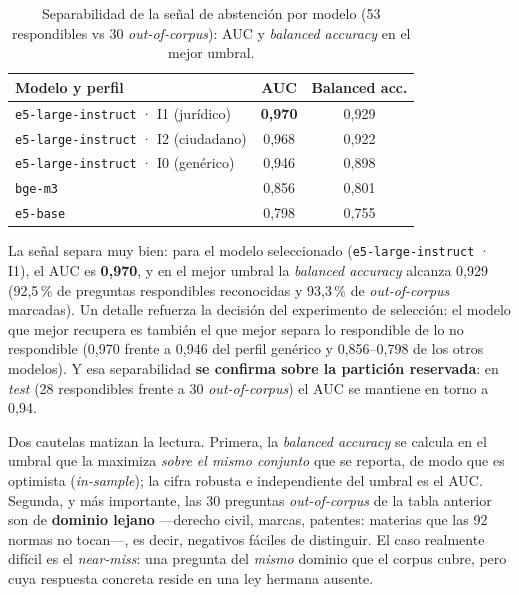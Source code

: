 \begin{table}[htbp]
    \centering
    \small
    \renewcommand{\arraystretch}{1.2}
    \caption{Separabilidad de la señal de abstención por modelo (53 respondibles vs 30 \emph{out-of-corpus}): AUC y \emph{balanced accuracy} en el mejor umbral.}
    \label{tab:abstencion-senal}
    \begin{tabular}{|l|c|c|}
        \hline
        \textbf{Modelo y perfil} & \textbf{AUC} & \textbf{Balanced acc.} \\
        \hline
        \texttt{e5-large-instruct} · I1 (jurídico)  & \textbf{0,970} & 0,929 \\
        \texttt{e5-large-instruct} · I2 (ciudadano) & 0,968          & 0,922 \\
        \texttt{e5-large-instruct} · I0 (genérico)  & 0,946          & 0,898 \\
        \texttt{bge-m3}                             & 0,856          & 0,801 \\
        \texttt{e5-base}                            & 0,798          & 0,755 \\
        \hline
    \end{tabular}
\end{table}

La señal separa muy bien: para el modelo seleccionado (\texttt{e5-large-instruct} · I1), el AUC es \textbf{0,970}, y en el mejor umbral la \emph{balanced accuracy} alcanza 0,929 (92,5\,\% de preguntas respondibles reconocidas y 93,3\,\% de \emph{out-of-corpus} marcadas). Un detalle refuerza la decisión del experimento de selección: el modelo que mejor recupera es también el que mejor separa lo respondible de lo no respondible (0,970 frente a 0,946 del perfil genérico y 0,856--0,798 de los otros modelos). Y esa separabilidad \textbf{se confirma sobre la partición reservada}: en \emph{test} (28 respondibles frente a 30 \emph{out-of-corpus}) el AUC se mantiene en torno a 0,94.

Dos cautelas matizan la lectura. Primera, la \emph{balanced accuracy} se calcula en el umbral que la maximiza \emph{sobre el mismo conjunto} que se reporta, de modo que es optimista (\emph{in-sample}); la cifra robusta e independiente del umbral es el AUC. Segunda, y más importante, las 30 preguntas \emph{out-of-corpus} de la tabla anterior son de \textbf{dominio lejano} —derecho civil, marcas, patentes: materias que las 92 normas no tocan—, es decir, negativos fáciles de distinguir. El caso realmente difícil es el \emph{near-miss}: una pregunta del \emph{mismo} dominio que el corpus cubre, pero cuya respuesta concreta reside en una ley hermana ausente.

